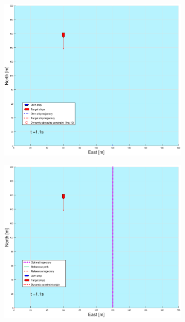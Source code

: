 \begin{figure}[!b] %
    \begin{subfigure}[b]{0.49\textwidth}
        \centering
        \includegraphics[width=\textwidth]{Images/Figures/sving_SO/_Simple_1fig1_time=1}
    \end{subfigure}
    \hfill
    \begin{subfigure}[b]{0.499\textwidth}
        \centering
        \includegraphics[width=\textwidth]{Images/Figures/sving_SO/_Simple_1fig999_time=1}

\end{subfigure}
\end{figure}
